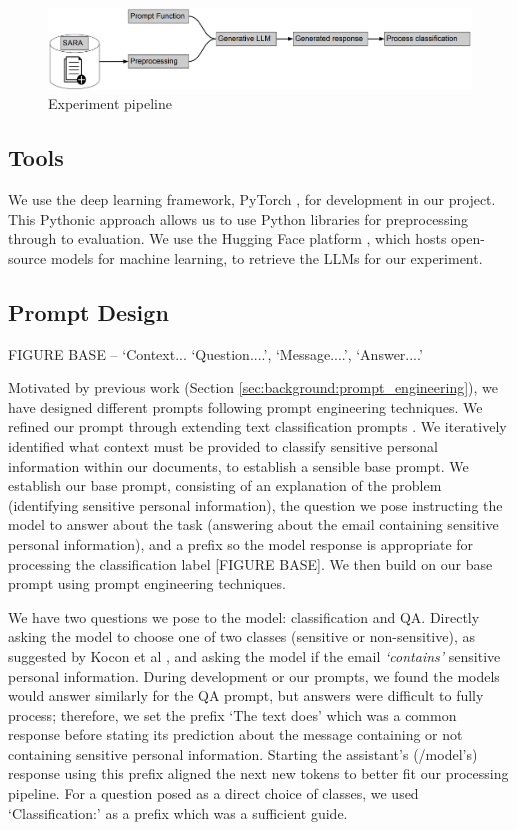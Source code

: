 \begin{figure}
\begin{center}
\includegraphics[scale=0.3]{figures/pipeline.pdf}
\end{center}
\caption{\label{fig-pipeline}Experiment pipeline}
\end{figure}

\subsection{Tools}
We use the deep learning framework, PyTorch \cite{paszke2019pytorch}, for development in our project. This Pythonic approach allows us to use Python libraries for preprocessing through to evaluation. We use the Hugging Face platform \cite{wolf-etal-2020-transformers}, which hosts open-source models for machine learning, to retrieve the LLMs for our experiment.

\subsection{Prompt Design}
FIGURE BASE – ‘Context... ‘Question....’, ‘Message....’, ‘Answer....’

Motivated by previous work (Section \ref{sec:background:prompt_engineering}), we have designed different prompts following prompt engineering techniques. We refined our prompt through extending text classification prompts \cite{kocon2023chatgpt}. We iteratively identified what context must be provided to classify sensitive personal information within our documents, to establish a sensible base prompt. We establish our base prompt, consisting of an explanation of the problem (identifying sensitive personal information), the question we pose instructing the model to answer about the task (answering about the email containing sensitive personal information), and a prefix so the model response is appropriate for processing the classification label [FIGURE BASE]. We then build on our base prompt using prompt engineering techniques.

We have two questions we pose to the model: classification and QA. Directly asking the model to choose one of two classes (sensitive or non-sensitive), as suggested by Kocon et al \cite{kocon2023chatgpt}, and asking the model if the email \emph{`contains'} sensitive personal information. During development or our prompts, we found the models would answer similarly for the QA prompt, but answers were difficult to fully process; therefore, we set the prefix ‘The text does’ which was a common response before stating its prediction about the message containing or not containing sensitive personal information. Starting the assistant’s (/model’s) response using this prefix aligned the next new tokens to better fit our processing pipeline. For a question posed as a direct choice of classes, we used `Classification:' as a prefix which was a sufficient guide.


